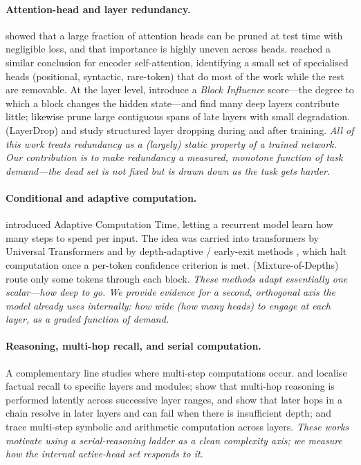 \documentclass[11pt]{article}
\begin{document}
\paragraph{Attention-head and layer redundancy.}
\citet{michel2019sixteen} showed that a large fraction of attention heads can
be pruned at test time with negligible loss, and that importance is highly
uneven across heads. \citet{voita2019analyzing} reached a similar conclusion
for encoder self-attention, identifying a small set of specialised heads
(positional, syntactic, rare-token) that do most of the work while the rest
are removable. At the layer level, \citet{men2024shortgpt} introduce a
\emph{Block Influence} score---the degree to which a block changes the hidden
state---and find many deep layers contribute little; \citet{gromov2024unreasonable}
likewise prune large contiguous spans of late layers with small degradation.
\citet{fan2020reducing} (LayerDrop) and \citet{sajjad2023effect} study
structured layer dropping during and after training. \emph{All of this work
treats redundancy as a (largely) static property of a trained network. Our
contribution is to make redundancy a measured, monotone function of task
demand---the dead set is not fixed but is drawn down as the task gets
harder.}

\paragraph{Conditional and adaptive computation.}
\citet{graves2016adaptive} introduced Adaptive Computation Time, letting a
recurrent model learn how many steps to spend per input. The idea was carried
into transformers by Universal Transformers \citep{dehghani2019universal} and
by depth-adaptive / early-exit methods
\citep{elbayad2020depth,xin2020deebert,schuster2022confident}, which halt
computation once a per-token confidence criterion is met.
\citet{raposo2024mixture} (Mixture-of-Depths) route only some tokens through
each block. \emph{These methods adapt essentially one scalar---how deep to
go. We provide evidence for a second, orthogonal axis the model already uses
internally: how \emph{wide} (how many heads) to engage at each layer, as a
graded function of demand.}

\paragraph{Reasoning, multi-hop recall, and serial computation.}
A complementary line studies where multi-step computations occur.
\citet{geva2023dissecting} and \citet{meng2022locating} localise factual
recall to specific layers and modules; \citet{yang2024large} show that
multi-hop reasoning is performed latently across successive layer ranges, and
\citet{biran2024hopping} show that later hops in a chain resolve in later
layers and can fail when there is insufficient depth; \citet{brinkmann2024mechanistic}
and \citet{stolfo2023mechanistic} trace multi-step symbolic and arithmetic
computation across layers. \emph{These works motivate using a serial-reasoning
ladder as a clean complexity axis; we measure how the internal active-head set
responds to it.}
\end{document}
